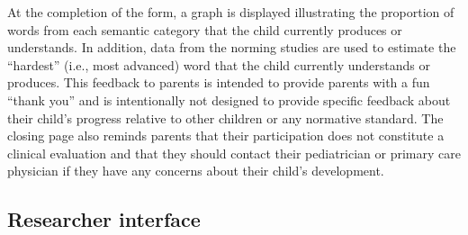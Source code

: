 \documentclass[
  english,
  ,man,floatsintext]{apa6}
\begin{document}
At the completion of the form, a graph is displayed illustrating the proportion of words from each semantic category that the child currently produces or understands. In addition, data from the norming studies are used to estimate the \enquote{hardest} (i.e., most advanced) word that the child currently understands or produces. This feedback to parents is intended to provide parents with a fun \enquote{thank you} and is intentionally not designed to provide specific feedback about their child's progress relative to other children or any normative standard. The closing page also reminds parents that their participation does not constitute a clinical evaluation and that they should contact their pediatrician or primary care physician if they have any concerns about their child's development.

\hypertarget{researcher-interface}{%
\subsection{Researcher interface}\label{researcher-interface}}
\end{document}
